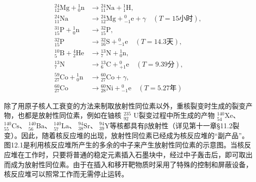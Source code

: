 \[
\begin{aligned}
{}^{24}_{12}\mathrm{Mg}+{}^{1}_{0}\mathrm{n}&\longrightarrow{}^{24}_{11}\mathrm{Na}+{}^{1}_{1}\mathrm{H},\\
{}^{24}_{11}\mathrm{Na}&\longrightarrow{}^{24}_{12}\mathrm{Mg}+{}^{0}_{-1}\mathrm{e}+\gamma \quad (T=15\text{小时}),\\
{}^{31}_{15}\mathrm{P}+{}^{1}_{0}\mathrm{n}&\longrightarrow{}^{32}_{15}\mathrm{P},\\
{}^{32}_{15}\mathrm{P}&\longrightarrow{}^{32}_{16}\mathrm{S}+{}^{0}_{-1}\mathrm{e}\quad (T=14.3\text{天}),\\
{}^{10}_{5}\mathrm{B}+{}^{4}_{2}\mathrm{He}&\longrightarrow{}^{13}_{7}\mathrm{N}+{}^{1}_{0}\mathrm{n},\\
{}^{13}_{7}\mathrm{N}&\longrightarrow{}^{13}_{6}\mathrm{C}+{}^{0}_{+1}\mathrm{e}\quad (T=9.39\text{分}),\\
{}^{59}_{27}\mathrm{Co}+{}^{1}_{0}\mathrm{n}&\longrightarrow{}^{60}_{27}\mathrm{Co}+\gamma,\\
{}^{60}_{27}\mathrm{Co}&\longrightarrow{}^{60}_{28}\mathrm{Ni}+{}^{0}_{-1}\mathrm{e}\quad (T=5.27\text{年})
\end{aligned}
\]

除了用原子核人工衰变的方法来制取放射性同位素以外，重核裂变时生成的裂变产物，也都是放射性同位素，例如在铀核
\(^{235}_{92}\) U裂变过程中所生成的产物 \(^{140}_{54}\mathrm{Xe}\)、
\(^{140}_{55}\mathrm{Cs}\)、 \(^{140}_{56}\mathrm{Ba}\)、
\(^{140}_{57}\mathrm{La}\)、 \(^{94}_{38}\mathrm{Sr}\)、
\(^{94}_{39}\mathrm{Y}\)等核都具有β放射性（详见第十一章§11.2裂变）。因此，随着核反应堆的出现，放射性同位素已经成为核反应堆的``副产品''。图12.1是利用核反应堆所产生的多余的中子来产生放射性同位素的示意图。当核反应堆在工作时，只要将普通的稳定元素插入石墨块中，经过中子轰击后，即可取出而成为放射性同位素。由于在插入和移开靶物质时采用了特殊的控制和屏蔽设备，核反应堆可以照常工作而无需停止运转。

